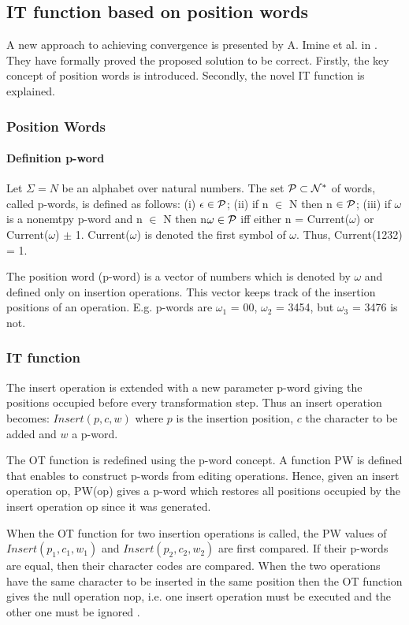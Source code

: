 \subsection{IT function based on position words}
\label{otf:imor}

A new approach to achieving convergence is presented by A. Imine et al. in \cite{imine04}. They have formally proved the proposed solution to be correct. Firstly, the key concept of position words is introduced. Secondly, the novel IT function is explained.

\subsubsection{Position Words}
\paragraph{Definition p-word} Let $\Sigma = N$ be an alphabet over natural numbers. The set $\cal P \subset N^*$ of words, called p-words, is defined as follows: (i) $\epsilon \in \cal P$; (ii) if n $\in$ N then n $\in \cal P$; (iii) if $\omega$ is a nonemtpy p-word and n $\in$ N then n$\omega \in \cal P$ iff either n = Current($\omega$) or Current($\omega$) $\pm$ 1. Current($\omega$) is denoted the first symbol of $\omega$. Thus, Current(1232) = 1.

The position word (p-word) is a vector of numbers which is denoted by $\omega$ and defined only on insertion operations. This vector keeps track of the insertion positions of an operation. E.g. p-words are $\omega_{1}$ = 00, $\omega_{2}$ = 3454, but $\omega_{3}$ = 3476 is not. 

\subsubsection{IT function}
The insert operation is extended with a new parameter p-word giving the positions occupied before every transformation step. Thus an insert operation becomes: $Insert(p,c,w)$ where $p$ is the insertion position, $c$ the character to be added and $w$ a p-word.

The OT function is redefined using the p-word concept. A function PW is defined that enables to construct p-words from editing operations. Hence, given an insert operation op, PW(op) gives a p-word which restores all positions occupied by the insert operation op since it was generated. 

When the OT function for two insertion operations is called, the PW values of $Insert(p_1,c_1,w_1)$ and $Insert(p_2,c_2,w_2)$ are first compared. If their p-words are equal, then their character codes are compared. When the two operations have the same character to be inserted in the same position then the OT function gives the null operation nop, i.e. one insert operation must be executed and the other one must be ignored \cite{suleiman98}.

